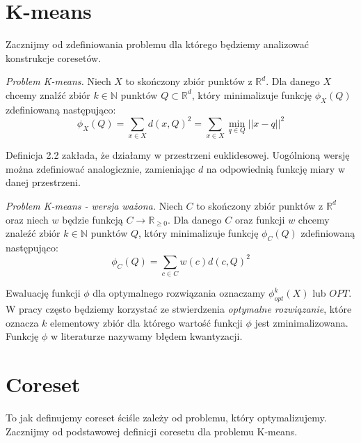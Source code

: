 \section{K-means}

Zacznijmy od zdefiniowania problemu dla którego będziemy analizować konstrukcje coresetów.

\begin{definition}
    \emph{Problem K-means.} Niech $X$ to skończony zbiór punktów z $\mathbb{R}^{d}$. 
    Dla danego $X$ chcemy znalźć zbiór $k \in \mathbb{N}$ punktów $Q \subset \mathbb{R}^{d}$, który minimalizuje funkcję $\phi_{X}(Q)$ zdefiniowaną następująco:
    \begin{equation}
        \phi_{X}(Q) = \sum_{x \in X} d(x, Q)^{2} = \sum_{x \in X} \min_{q \in Q} || x - q ||^{2} 
    \end{equation}
\end{definition}

\noindent
Definicja 2.2 zakłada, że działamy w przestrzeni euklidesowej.
Uogólnioną wersję można zdefiniować analogicznie, zamieniając $d$ na odpowiednią funkcję miary w danej przestrzeni.

\begin{definition}
    \emph{Problem K-means - wersja ważona.} Niech $C$ to skończony zbiór punktów z $\mathbb{R}^{d}$ oraz niech $w$ będzie funkcją $C \rightarrow \mathbb{R}_{\ge0}$. 
    Dla danego $C$ oraz funkcji $w$ chcemy znaleźć zbiór $k \in \mathbb{N}$ punktów $Q$, który minimalizuje funkcję $\phi_{C}(Q)$ zdefiniowaną następująco:
    \begin{equation}
        \phi_{C}(Q) = \sum_{c \in C} w(c) d(c, Q)^{2}
    \end{equation}
\end{definition}

\noindent
Ewaluację funkcji $\phi$ dla optymalnego rozwiązania oznaczamy $\phi_{opt}^{k}(X)$ lub $OPT$.
W pracy często będziemy korzystać ze stwierdzenia \textit{optymalne rozwiązanie}, które oznacza $k$ elementowy zbiór dla którego wartość funkcji $\phi$ jest zminimalizowana. 
Funkcję $\phi$ w literaturze nazywamy błędem kwantyzacji.

\section{Coreset}

To jak definujemy coreset ściśle zależy od problemu, który optymalizujemy.
Zacznijmy od podstawowej definicji coresetu dla problemu K-means.

